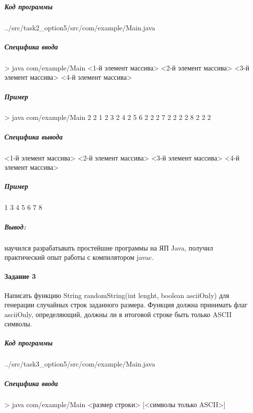 
\subparagraph{Код программы} \hspace{0pt}


{../src/task2_option5/src/com/example/Main.java}

\subparagraph{Специфика ввода} \hspace{0pt}

> java com/example/Main <1-й элемент массива> <2-й элемент массива> <3-й элемент массива> <4-й элемент массива>

\subparagraph{Пример} \hspace{0pt}

> java com/example/Main 2 2 1 2 3 2 4 2 5 6 2 2 2 7 2 2 2 2 8 2 2 2

\subparagraph{Специфика вывода} \hspace{0pt}

<1-й элемент массива> <2-й элемент массива> <3-й элемент массива> <4-й элемент массива>

\subparagraph{Пример} \hspace{0pt}

1 3 4 5 6 7 8

\subparagraph{Вывод:}
научился разрабатывать простейшие программы на ЯП Java,
получил практический опыт работы с компилятором javac.



\paragraph{Задание 3} \hspace{0pt}

Написать функцию String randomString(int lenght, boolean asciiOnly)
для генерации случайных строк заданного размера.
Функция должна принимать флаг asciiOnly, определяющий,
должны ли в итоговой строке быть только ASCII символы.


\subparagraph{Код программы} \hspace{0pt}


{../src/task3_option5/src/com/example/Main.java}

\subparagraph{Специфика ввода} \hspace{0pt}

> java com/example/Main <размер строки> [<символы только ASCII>]

